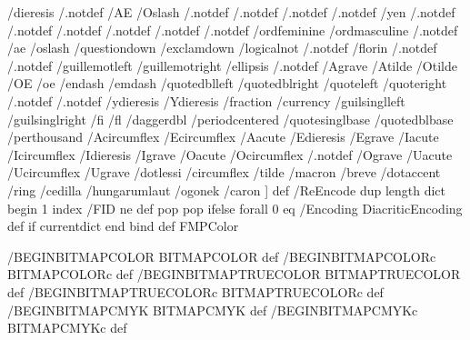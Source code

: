 /dieresis /.notdef /AE /Oslash /.notdef /.notdef /.notdef /.notdef
/yen /.notdef /.notdef /.notdef /.notdef /.notdef /.notdef
/ordfeminine /ordmasculine /.notdef /ae /oslash /questiondown
/exclamdown /logicalnot /.notdef /florin /.notdef /.notdef
/guillemotleft /guillemotright /ellipsis /.notdef /Agrave /Atilde
/Otilde /OE /oe /endash /emdash /quotedblleft /quotedblright
/quoteleft /quoteright /.notdef /.notdef /ydieresis /Ydieresis
/fraction /currency /guilsinglleft /guilsinglright /fi /fl /daggerdbl
/periodcentered /quotesinglbase /quotedblbase /perthousand
/Acircumflex /Ecircumflex /Aacute /Edieresis /Egrave /Iacute
/Icircumflex /Idieresis /Igrave /Oacute /Ocircumflex /.notdef /Ograve
/Uacute /Ucircumflex /Ugrave /dotlessi /circumflex /tilde /macron
/breve /dotaccent /ring /cedilla /hungarumlaut /ogonek /caron
] def
/ReEncode { 
	dup 
	length 
	dict begin 
	{
	1 index /FID ne 
		{def} 
		{pop pop} ifelse 
	} forall 
	0 eq {/Encoding DiacriticEncoding def} if 
	currentdict 
	end 
	} bind def
FMPColor 
	
	{
	/BEGINBITMAPCOLOR { 
		BITMAPCOLOR} def
	/BEGINBITMAPCOLORc { 
		BITMAPCOLORc} def
	/BEGINBITMAPTRUECOLOR { 
		BITMAPTRUECOLOR } def
	/BEGINBITMAPTRUECOLORc { 
		BITMAPTRUECOLORc } def
	/BEGINBITMAPCMYK { 
		BITMAPCMYK } def
	/BEGINBITMAPCMYKc { 
		BITMAPCMYKc } def
	}
	
